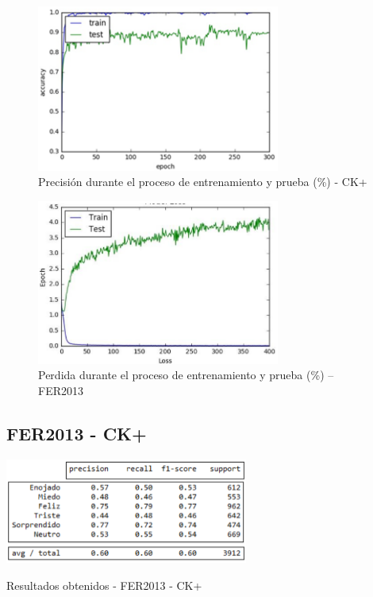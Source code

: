 \begin{figure}[H]
		\centering
		\includegraphics[width=80mm]{./Imagenes/precision_ck+.png}
		\caption{Precisión durante el proceso de entrenamiento y prueba (\%) - CK+}
		\label{fig:precision-ck+}
\end{figure}

\begin{figure}[H]
		\centering
		\includegraphics[width=80mm]{./Imagenes/perdida_ck+.png}
		\caption{Perdida durante el proceso de entrenamiento y prueba (\%) – FER2013}
		\label{fig:perdida_ck+}
\end{figure}

\subsection{FER2013 - CK+}


\begin{table}[H]
    \centering
    \includegraphics[width=80mm]{./Imagenes/tabla_resultados_fer_ck+.png} 
    \caption{Resultados obtenidos - FER2013 - CK+}
    \label{tab:tabla_resultados_fer_ck+}
\end{table}

